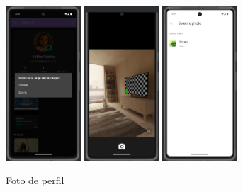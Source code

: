 \documentclass[a4paper,11pt]{report}
\begin{document}
      \begin{figure}[H]
        \centering
        \includegraphics[width=0.25\textwidth]{.img/foto_perfil_1.png}
        \hspace{1cm}
        \includegraphics[width=0.25\textwidth]{.img/foto_perfil_2.png}
        \hspace{1cm}
        \includegraphics[width=0.25\textwidth]{.img/foto_perfil_3.png}
        \caption{Foto de perfil}
        \label{fig:perfil}
      \end{figure}
\end{document}
